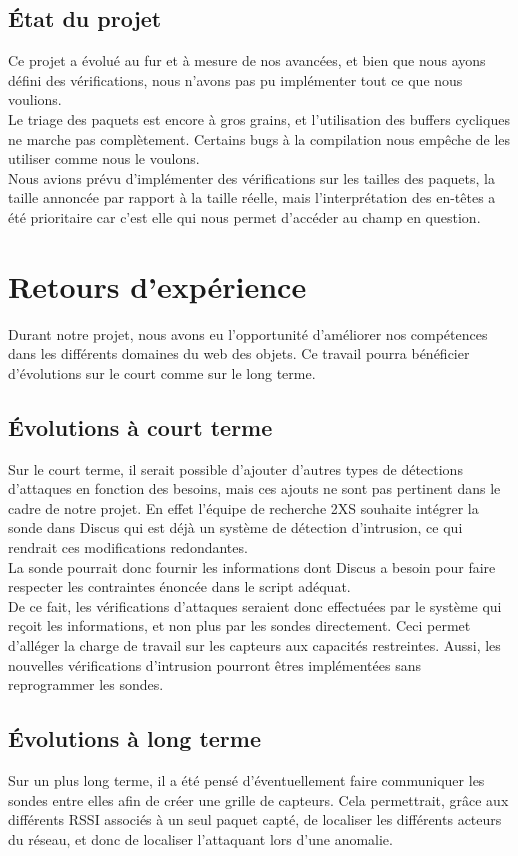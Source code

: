 	\subsection{État du projet}
		Ce projet a évolué au fur et à mesure de nos avancées, et bien que nous ayons défini des vérifications, nous n'avons pas pu implémenter tout ce que nous voulions.\\
		Le triage des paquets est encore à gros grains, et l'utilisation des buffers cycliques ne marche pas complètement. Certains bugs à la compilation nous empêche de les utiliser comme nous le voulons.\\
		Nous avions prévu d'implémenter des vérifications sur les tailles des paquets, la taille annoncée par rapport à la taille réelle, mais l'interprétation des en-têtes a été prioritaire car c'est elle qui nous permet d'accéder au champ en question.

\section{Retours d'expérience} %
    Durant notre projet, nous avons eu l'opportunité d'améliorer nos compétences dans les différents domaines du web des objets. Ce travail pourra bénéficier d'évolutions sur le court comme sur le long terme.
    
	\subsection{Évolutions à court terme} %
	Sur le court terme, il serait possible d'ajouter d'autres types de détections d'attaques en fonction des besoins, mais ces ajouts ne sont pas pertinent dans le cadre de notre projet. En effet l'équipe de recherche 2XS souhaite intégrer la sonde dans Discus qui est déjà un système de détection d'intrusion, ce qui rendrait ces modifications redondantes.\\
	La sonde pourrait donc fournir les informations dont Discus a besoin pour faire respecter les contraintes énoncée dans le script adéquat.\\ 
	De ce fait, les vérifications d'attaques seraient donc effectuées par le système qui reçoit les informations, et non plus par les sondes directement. Ceci permet d'alléger la charge de travail sur les capteurs aux capacités restreintes. Aussi, les nouvelles vérifications d'intrusion pourront êtres implémentées sans reprogrammer les sondes.
	\subsection{Évolutions à long terme} %
	Sur un plus long terme, il a été pensé d'éventuellement faire communiquer les sondes entre elles afin de créer une grille de capteurs.
	Cela permettrait, grâce aux différents RSSI associés à un seul paquet capté, de localiser les différents acteurs du réseau, et donc de localiser l'attaquant lors d'une anomalie.

